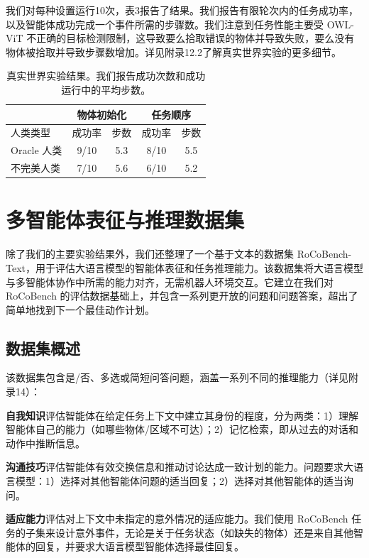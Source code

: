 \documentclass[UTF8, a4paper, 12pt]{article}
\begin{document}
我们对每种设置运行10次，表3报告了结果。我们报告有限轮次内的任务成功率，以及智能体成功完成一个事件所需的步骤数。我们注意到任务性能主要受 OWL-ViT 不正确的目标检测限制，这导致要么拾取错误的物体并导致失败，要么没有物体被拾取并导致步骤数增加。详见附录12.2了解真实世界实验的更多细节。

\begin{table}[htbp]
\centering
\caption{真实世界实验结果。我们报告成功次数和成功运行中的平均步数。}
\begin{tabular}{lcccc}
\toprule
 & \multicolumn{2}{c}{物体初始化} & \multicolumn{2}{c}{任务顺序} \\
\midrule
人类类型 & 成功率 & 步数 & 成功率 & 步数 \\
\midrule
Oracle 人类 & 9/10 & 5.3 & 8/10 & 5.5 \\
不完美人类 & 7/10 & 5.6 & 6/10 & 5.2 \\
\bottomrule
\end{tabular}
\end{table}

\section{多智能体表征与推理数据集}

除了我们的主要实验结果外，我们还整理了一个基于文本的数据集 RoCoBench-Text，用于评估大语言模型的智能体表征和任务推理能力。该数据集将大语言模型与多智能体协作中所需的能力对齐，无需机器人环境交互。它建立在我们对 RoCoBench 的评估数据基础上，并包含一系列更开放的问题和问题答案，超出了简单地找到下一个最佳动作计划。

\subsection{数据集概述}

该数据集包含是/否、多选或简短问答问题，涵盖一系列不同的推理能力（详见附录14）：

\textbf{自我知识}评估智能体在给定任务上下文中建立其身份的程度，分为两类：1）理解智能体自己的能力（如哪些物体/区域不可达）；2）记忆检索，即从过去的对话和动作中推断信息。

\textbf{沟通技巧}评估智能体有效交换信息和推动讨论达成一致计划的能力。问题要求大语言模型：1）选择对其他智能体问题的适当回复；2）选择对其他智能体的适当询问。

\textbf{适应能力}评估对上下文中未指定的意外情况的适应能力。我们使用 RoCoBench 任务的子集来设计意外事件，无论是关于任务状态（如缺失的物体）还是来自其他智能体的回复，并要求大语言模型智能体选择最佳回复。
\end{document}
